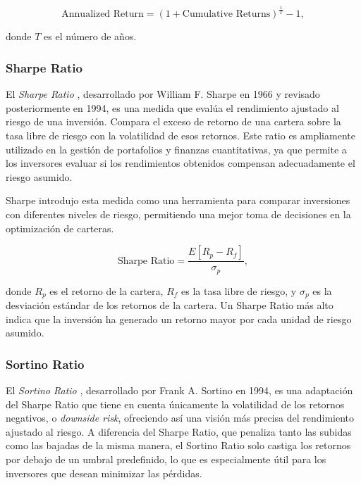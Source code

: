\documentclass[a4paper,12pt, twoside]{report}
\begin{document}
\begin{equation}
\text{Annualized Return} = \left(1 + \text{Cumulative Returns}\right)^{\frac{1}{T}} - 1,
\end{equation}

donde $T$ es el número de años.

\subsubsection{Sharpe Ratio}

El \textit{Sharpe Ratio} \cite{sharpe1994}, desarrollado por William F. Sharpe en 1966 y revisado 
posteriormente en 1994, es una medida que evalúa el rendimiento ajustado al riesgo de una inversión. 
Compara el exceso de retorno de una cartera sobre la tasa libre de riesgo con la volatilidad de esos 
retornos. Este ratio es ampliamente utilizado en la gestión de portafolios y finanzas cuantitativas, 
ya que permite a los inversores evaluar si los rendimientos obtenidos compensan adecuadamente el 
riesgo asumido.

Sharpe introdujo esta medida como una herramienta para comparar inversiones con diferentes 
niveles de riesgo, permitiendo una mejor toma de decisiones en la optimización de carteras.

\begin{equation}
\text{Sharpe Ratio} = \frac{E[R_p - R_f]}{\sigma_p},
\end{equation}

donde $R_p$ es el retorno de la cartera, $R_f$ es la tasa libre de riesgo, y $\sigma_p$ es 
la desviación estándar de los retornos de la cartera. Un Sharpe Ratio más alto indica que la 
inversión ha generado un retorno mayor por cada unidad de riesgo asumido.

\subsubsection{Sortino Ratio}


El \textit{Sortino Ratio} \cite{sortino1994}, desarrollado por Frank A. Sortino en 1994, es una adaptación 
del Sharpe Ratio que tiene en cuenta únicamente la volatilidad de los retornos negativos, o 
\textit{downside risk}, ofreciendo así una visión más precisa del rendimiento ajustado al riesgo. 
A diferencia del Sharpe Ratio, que penaliza tanto las subidas como las bajadas de la misma manera, 
el Sortino Ratio solo castiga los retornos por debajo de un umbral predefinido, lo que es especialmente 
útil para los inversores que desean minimizar las pérdidas.
\end{document}
